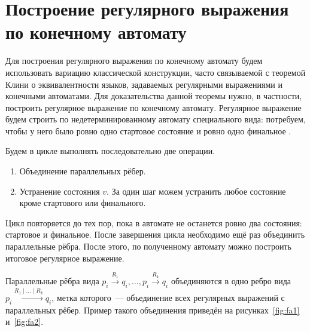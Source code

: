 \section{Построение регулярного выражения по конечному автомату}
\label{sec:FAToRegex}

Для построения регулярного выражения по конечному автомату будем использовать вариацию классической конструкции, часто связываемой с теоремой Клини о эквивалентности языков, задаваемых регулярными выражениями и конечными автоматами.
Для доказательства данной теоремы нужно, в частности, построить регулярное выражение по конечному автомату.
Регулярное выражение будем строить по недетерминированному автомату специального вида: потребуем, чтобы у него было ровно одно стартовое состояние и ровно одно финальное%
.

Будем в цикле выполнять последовательно две операции.
\begin{enumerate}
    \item Объединение параллельных рёбер.
    \item Устранение состояния $v$. За один шаг можем устранить любое состояние кроме стартового или финального.
\end{enumerate}
Цикл повторяется до тех пор, пока в автомате не останется ровно два состояния: стартовое и финальное.
После завершения цикла необходимо ещё раз объединить параллельные рёбра.
После этого, по полученному автомату можно построить итоговое регулярное выражение.

Параллельные рёбра вида $p_i \xrightarrow{R_1} q_i, \ldots, p_i \xrightarrow{R_k} q_i$ объединяются в одно ребро вида $p_i \xrightarrow{R_1 \mid \ldots \mid R_k} q_i$, метка которого~--- объединение всех регулярных выражений с параллельных рёбер.
Пример такого объединения приведён на рисунках~\ref{fig:fa1} и~\ref{fig:fa2}.


\begin{marginfigure}
    \begin{center}
        
    \end{center}
    \caption{Два состояния с параллельными рёбрами}
    \label{fig:fa1}
\end{marginfigure}
\begin{marginfigure}

    \begin{center}
        
    \end{center}
    \caption{Результат объединения параллельных рёбер для состояний, представленных на рисунке~\ref{fig:fa1}}
    \label{fig:fa2}
\end{marginfigure}

